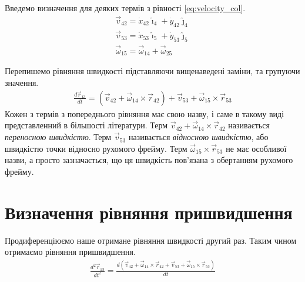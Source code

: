\documentclass[12pt]{article}
\begin{document}
 	Введемо визначення для деяких термів з рівності \ref{eq:velocity_col}.
 	\begin{gather}
 	\vec{v}_{42} = \dot{x}_{42} \hat{\imath}_{4} + \dot{y}_{42} \hat{\jmath}_{4}\\
 	\vec{v}_{53} = \dot{x}_{53} \hat{\imath}_{5} + \dot{y}_{53} \hat{\jmath}_{5}\\
 	\vec{\omega}_{15} = \vec{\omega}_{14} + \vec{\omega}_{25}
 	\end{gather}
 	
 	Перепишемо рівняння швидкості підставляючи вищенаведені заміни, та групуючи значення.
 		\begin{gather} 
 		\label {eq:velocity}
 		\frac{d\vec{r}_{13}}{d t} = (\vec{v}_{42} + \vec{\omega}_{14} \times \vec{r}_{42}) + \vec{v}_{53} +  \vec{\omega}_{15} \times \vec{r}_{53}
 		\end{gather}
 	Кожен з термів з попереднього рівняння має свою назву, і саме в такому виді представленний в більшості літератури. Терм $\vec{v}_{42} + \vec{\omega}_{14} \times \vec{r}_{42}$ називається \textit{переносною швидкістю}. Терм $\vec{v}_{53}$ називається \textit{відносною швидкістю}, або швидкістю точки відносно рухомого фрейму. Терм $\vec{\omega}_{15} \times \vec{r}_{53}$ не має особливої назви, а просто зазначається, що ця швидкість пов'язана з обертанням рухомого фрейму.
 	
 	\section*{Визначення рівняння пришвидшення}
 	Продиференціюємо наше отримане рівняння швидкості другий раз. Таким чином отримаємо рівняння пришвидшення.
 	\begin{gather} 
 	\label {eq:acc_col}
 		\frac{d^2\vec{r}_{13}}{d t^2} = \frac{d(\vec{v}_{42} + \vec{\omega}_{14} \times \vec{r}_{42} + \vec{v}_{53} +  \vec{\omega}_{15} \times \vec{r}_{53})}{d t}
 	\end{gather}
 	
\end{document}
